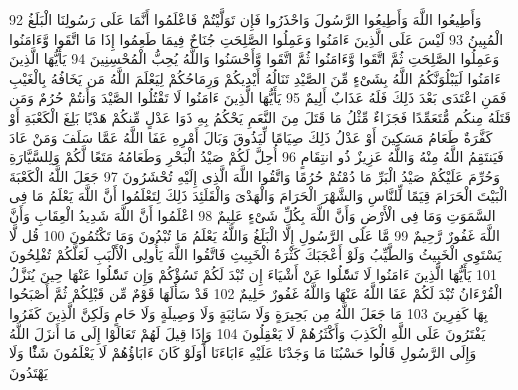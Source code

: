 \documentclass[20pt,a4paper]{article}
\begin{document}
{\tiny\colorbox{cl_aya}{92}} وَأَطِيعُوا اللَّهَ وَأَطِيعُوا الرَّسُولَ وَاحْذَرُوا فَإِن تَوَلَّيْتُمْ فَاعْلَمُوا أَنَّمَا عَلَى رَسُولِنَا الْبَلَغُ الْمُبِينُ
{\tiny\colorbox{cl_aya}{93}} لَيْسَ عَلَى الَّذِينَ ءَامَنُوا وَعَمِلُوا الصَّلِحَتِ جُنَاحٌ فِيمَا طَعِمُوا إِذَا مَا اتَّقَوا وَّءَامَنُوا وَعَمِلُوا الصَّلِحَتِ ثُمَّ اتَّقَوا وَّءَامَنُوا ثُمَّ اتَّقَوا وَّأَحْسَنُوا وَاللَّهُ يُحِبُّ الْمُحْسِنِينَ
{\tiny\colorbox{cl_aya}{94}} يَأَيُّهَا الَّذِينَ ءَامَنُوا لَيَبْلُوَنَّكُمُ اللَّهُ بِشَىْءٍ مِّنَ الصَّيْدِ تَنَالُهُ أَيْدِيكُمْ وَرِمَاحُكُمْ لِيَعْلَمَ اللَّهُ مَن يَخَافُهُ بِالْغَيْبِ فَمَنِ اعْتَدَى بَعْدَ ذَلِكَ فَلَهُ عَذَابٌ أَلِيمٌ
{\tiny\colorbox{cl_aya}{95}} يَأَيُّهَا الَّذِينَ ءَامَنُوا لَا تَقْتُلُوا الصَّيْدَ وَأَنتُمْ حُرُمٌ وَمَن قَتَلَهُ مِنكُم مُّتَعَمِّدًا فَجَزَاءٌ مِّثْلُ مَا قَتَلَ مِنَ النَّعَمِ يَحْكُمُ بِهِ ذَوَا عَدْلٍ مِّنكُمْ هَدْيًا بَلِغَ الْكَعْبَةِ أَوْ كَفَّرَةٌ طَعَامُ مَسَكِينَ أَوْ عَدْلُ ذَلِكَ صِيَامًا لِّيَذُوقَ وَبَالَ أَمْرِهِ عَفَا اللَّهُ عَمَّا سَلَفَ وَمَنْ عَادَ فَيَنتَقِمُ اللَّهُ مِنْهُ وَاللَّهُ عَزِيزٌ ذُو انتِقَامٍ
{\tiny\colorbox{cl_aya}{96}} أُحِلَّ لَكُمْ صَيْدُ الْبَحْرِ وَطَعَامُهُ مَتَعًا لَّكُمْ وَلِلسَّيَّارَةِ وَحُرِّمَ عَلَيْكُمْ صَيْدُ الْبَرِّ مَا دُمْتُمْ حُرُمًا وَاتَّقُوا اللَّهَ الَّذِى إِلَيْهِ تُحْشَرُونَ
{\tiny\colorbox{cl_aya}{97}} جَعَلَ اللَّهُ الْكَعْبَةَ الْبَيْتَ الْحَرَامَ قِيَمًا لِّلنَّاسِ وَالشَّهْرَ الْحَرَامَ وَالْهَدْىَ وَالْقَلَئِدَ ذَلِكَ لِتَعْلَمُوا أَنَّ اللَّهَ يَعْلَمُ مَا فِى السَّمَوَتِ وَمَا فِى الْأَرْضِ وَأَنَّ اللَّهَ بِكُلِّ شَىْءٍ عَلِيمٌ
{\tiny\colorbox{cl_aya}{98}} اعْلَمُوا أَنَّ اللَّهَ شَدِيدُ الْعِقَابِ وَأَنَّ اللَّهَ غَفُورٌ رَّحِيمٌ
{\tiny\colorbox{cl_aya}{99}} مَّا عَلَى الرَّسُولِ إِلَّا الْبَلَغُ وَاللَّهُ يَعْلَمُ مَا تُبْدُونَ وَمَا تَكْتُمُونَ
{\tiny\colorbox{cl_aya}{100}} قُل لَّا يَسْتَوِى الْخَبِيثُ وَالطَّيِّبُ وَلَوْ أَعْجَبَكَ كَثْرَةُ الْخَبِيثِ فَاتَّقُوا اللَّهَ يَأُولِى الْأَلْبَبِ لَعَلَّكُمْ تُفْلِحُونَ
{\tiny\colorbox{cl_aya}{101}} يَأَيُّهَا الَّذِينَ ءَامَنُوا لَا تَسَْٔلُوا عَنْ أَشْيَاءَ إِن تُبْدَ لَكُمْ تَسُؤْكُمْ وَإِن تَسَْٔلُوا عَنْهَا حِينَ يُنَزَّلُ الْقُرْءَانُ تُبْدَ لَكُمْ عَفَا اللَّهُ عَنْهَا وَاللَّهُ غَفُورٌ حَلِيمٌ
{\tiny\colorbox{cl_aya}{102}} قَدْ سَأَلَهَا قَوْمٌ مِّن قَبْلِكُمْ ثُمَّ أَصْبَحُوا بِهَا كَفِرِينَ
{\tiny\colorbox{cl_aya}{103}} مَا جَعَلَ اللَّهُ مِن بَحِيرَةٍ وَلَا سَائِبَةٍ وَلَا وَصِيلَةٍ وَلَا حَامٍ وَلَكِنَّ الَّذِينَ كَفَرُوا يَفْتَرُونَ عَلَى اللَّهِ الْكَذِبَ وَأَكْثَرُهُمْ لَا يَعْقِلُونَ
{\tiny\colorbox{cl_aya}{104}} وَإِذَا قِيلَ لَهُمْ تَعَالَوْا إِلَى مَا أَنزَلَ اللَّهُ وَإِلَى الرَّسُولِ قَالُوا حَسْبُنَا مَا وَجَدْنَا عَلَيْهِ ءَابَاءَنَا أَوَلَوْ كَانَ ءَابَاؤُهُمْ لَا يَعْلَمُونَ شَئًْا وَلَا يَهْتَدُونَ
\end{document}
